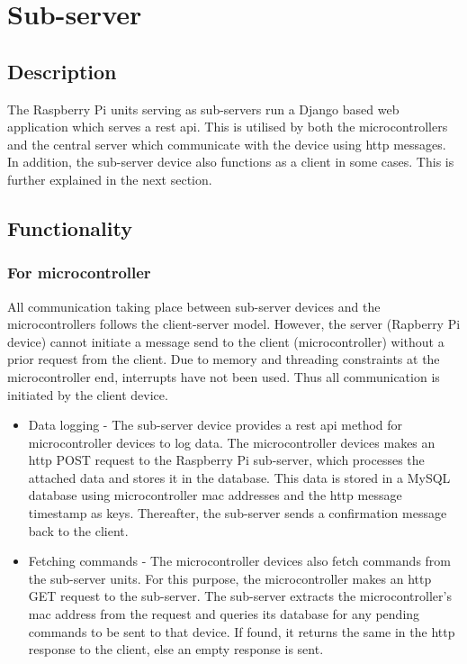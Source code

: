 \documentclass[letterpaper,11pt]{report}
\begin{document}
\section{Sub-server}
\subsection{Description}
The Raspberry Pi units serving as sub-servers run a Django based web application which serves a \ac{rest} \ac{api}. This is utilised by both the microcontrollers and the central server which communicate with the device using \ac{http} messages. In addition, the sub-server device also functions as a client in some cases. This is further explained in the next section.
\subsection{Functionality}
\subsubsection{For microcontroller}
All communication taking place between sub-server devices and the microcontrollers follows the client-server model. However, the server (Rapberry Pi device) cannot initiate a message send to the client (microcontroller) without a prior request from the client. Due to memory and threading constraints at the microcontroller end, interrupts have not been used. Thus all communication is initiated by the client device. 
\begin{itemize}
    \item Data logging - The sub-server device provides a \ac{rest} \ac{api} method for microcontroller devices to log data. The microcontroller devices makes an \ac{http} POST request to the Raspberry Pi sub-server, which processes the attached data and stores it in the database. This data is stored in a MySQL database using microcontroller \ac{mac} addresses and the \ac{http} message timestamp as keys. Thereafter, the sub-server sends a confirmation message back to the client.
    \item Fetching commands - The microcontroller devices also fetch commands from the sub-server units. For this purpose, the microcontroller makes an \ac{http} GET request to the sub-server. The sub-server extracts the microcontroller's \ac{mac} address from the request and queries its database for any pending commands to be sent to that device. If found, it returns the same in the \ac{http} response to the client, else an empty response is sent.
\end{itemize}
\end{document}
